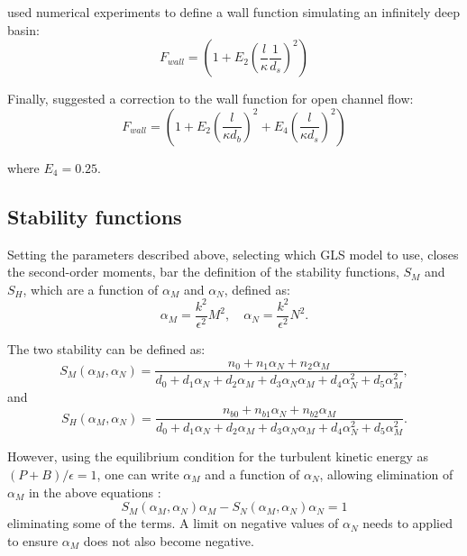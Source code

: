 \citet{burchard2001} used numerical experiments to define a wall function simulating an infinitely deep
basin:
\begin{equation}
F_{wall} = \left(1+E_2 \left(\frac{l}{\kappa} \frac{1}{d_s}\right)^2\right)
\end{equation}

Finally, \citet{blumberg1992} suggested a correction to the wall function for open channel flow:
\begin{equation}
F_{wall} = \left(1+E_2 \left(\frac{l}{\kappa d_b}\right)^2 + E_4 \left(\frac{l}{\kappa d_s}\right)^2\right)
\end{equation}

\noindent
where $E_4=0.25$.


\subsection{Stability functions}

Setting the parameters described above, \ie selecting which GLS model to use, closes the second-order
moments, bar the definition of the stability functions, $S_M$ and $S_H$,
which are a function of $\alpha_M$ and $\alpha_N$, defined as:
\begin{equation*}
\alpha_M=\frac{k^2}{\epsilon^2}M^2, \quad
\alpha_N=\frac{k^2}{\epsilon^2}N^2.
\end{equation*}

The two stability can be defined as:
\begin{equation*}
S_M(\alpha_M,\alpha_N) = \frac{n_0+n_1\alpha_N+n_2\alpha_M}{d_0+d_1\alpha_N+d_2\alpha_M+d_3\alpha_N\alpha_M+d_4\alpha_N^2+d_5\alpha_M^2},
\end{equation*}
and
\begin{equation*}
S_H(\alpha_M,\alpha_N) = \frac{n_{b0}+n_{b1}\alpha_N+n_{b2}\alpha_M}{d_0+d_1\alpha_N+d_2\alpha_M+d_3\alpha_N\alpha_M+d_4\alpha_N^2+d_5\alpha_M^2}.
\end{equation*}

However, using the equilibrium condition for the turbulent kinetic energy as $(P+B)/\epsilon=1$, one can write
$\alpha_M$ and a function of $\alpha_N$, allowing elimination of $\alpha_M$ in the above equations \citep{umlauf2005}:
\begin{equation*}
S_M(\alpha_M,\alpha_N)\alpha_M - S_N(\alpha_M,\alpha_N)\alpha_N=1
\end{equation*}
eliminating some of the terms. A limit on negative values of $\alpha_N$ needs to applied to ensure $\alpha_M$ does not also become negative.


